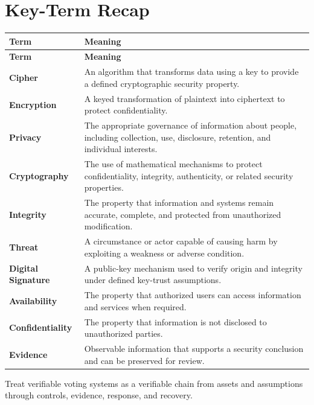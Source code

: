 \documentclass[11pt]{article}
\begin{document}
\section*{Key-Term Recap}
\begin{longtable}{>{\RaggedRight\arraybackslash}p{}>{\RaggedRight\arraybackslash}p{}}
\toprule\rowcolor{Navy}\color{white}\textbf{Term} & \color{white}\textbf{Meaning}\\\midrule
\endfirsthead
\toprule\rowcolor{Navy}\color{white}\textbf{Term} & \color{white}\textbf{Meaning}\\\midrule
\endhead
\textbf{Cipher} & An algorithm that transforms data using a key to provide a defined cryptographic security property. \\\midrule
\textbf{Encryption} & A keyed transformation of plaintext into ciphertext to protect confidentiality. \\\midrule
\textbf{Privacy} & The appropriate governance of information about people, including collection, use, disclosure, retention, and individual interests. \\\midrule
\textbf{Cryptography} & The use of mathematical mechanisms to protect confidentiality, integrity, authenticity, or related security properties. \\\midrule
\textbf{Integrity} & The property that information and systems remain accurate, complete, and protected from unauthorized modification. \\\midrule
\textbf{Threat} & A circumstance or actor capable of causing harm by exploiting a weakness or adverse condition. \\\midrule
\textbf{Digital Signature} & A public-key mechanism used to verify origin and integrity under defined key-trust assumptions. \\\midrule
\textbf{Availability} & The property that authorized users can access information and services when required. \\\midrule
\textbf{Confidentiality} & The property that information is not disclosed to unauthorized parties. \\\midrule
\textbf{Evidence} & Observable information that supports a security conclusion and can be preserved for review. \\\midrule
\bottomrule
\end{longtable}
\begin{takeawaybox}
Treat verifiable voting systems as a verifiable chain from assets and assumptions through controls, evidence, response, and recovery.
\end{takeawaybox}
\end{document}
